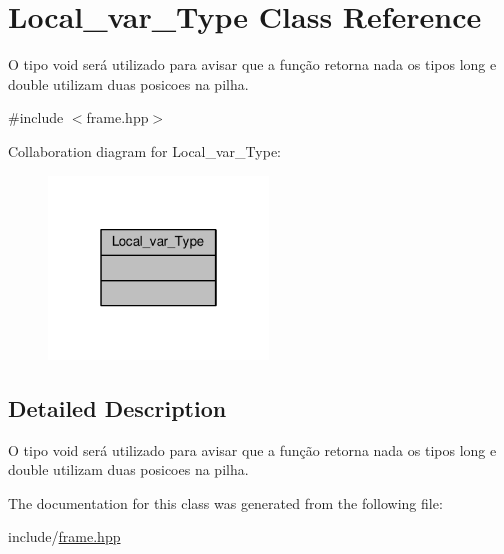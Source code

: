 \hypertarget{classLocal__var__Type}{\section{Local\+\_\+var\+\_\+\+Type Class Reference}
\label{classLocal__var__Type}
}


O tipo void será utilizado para avisar que a função retorna nada os tipos long e double utilizam duas posicoes na pilha.  




{\ttfamily \#include $<$frame.\+hpp$>$}



Collaboration diagram for Local\+\_\+var\+\_\+\+Type\+:\nopagebreak
\begin{figure}[H]
\begin{center}
\leavevmode
\includegraphics[width=166pt]{classLocal__var__Type__coll__graph}
\end{center}
\end{figure}


\subsection{Detailed Description}
O tipo void será utilizado para avisar que a função retorna nada os tipos long e double utilizam duas posicoes na pilha. 

The documentation for this class was generated from the following file\+:\begin{DoxyCompactItemize}
\item 
include/\hyperlink{frame_8hpp}{frame.\+hpp}\end{DoxyCompactItemize}
